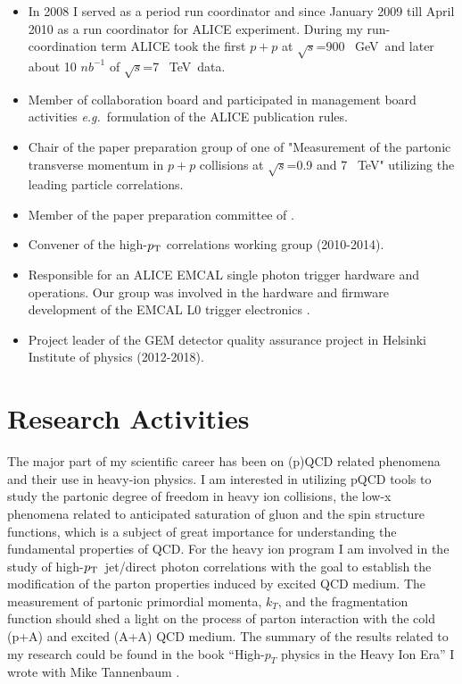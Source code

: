 \documentclass[12pt]{article}
\newcommand{\s} {\ensuremath{\sqrt{s}}}
\def\tev{\mbox{~TeV}}
\def\gev{\mbox{~GeV}}
\def\eg{{\it e.g.}}
\def\pt#1{\ensuremath{p_{\rm T#1}}}
\begin{document}
\begin{itemize}
\item In 2008 I served as a period run coordinator and since January 2009 till April 2010  as a run coordinator for ALICE experiment. During my run-coordination term ALICE took the first $p+p$ at \s=900 \gev\ and later about 10 $nb^{-1}$ of \s=7 \tev\ data.
\item Member of collaboration board and participated in management board activities \eg\ formulation of the ALICE publication rules.
\item Chair of the paper preparation group of one of  "Measurement of the partonic transverse momentum in $p+p$ collisions at \s=0.9 and 7 \tev" utilizing the leading particle correlations. 
\item Member of the paper preparation committee of \cite{Aamodt2012}.
\item Convener of the high-\pt{} correlations working group (2010-2014).
\item Responsible for an ALICE EMCAL single photon trigger hardware and operations. Our group was involved in the hardware and firmware development of the EMCAL L0 trigger electronics \cite{JiriKral2012}.
\item Project leader of the GEM detector quality assurance project in Helsinki Institute of physics (2012-2018).
\end{itemize}



\section{Research Activities}
The major part of my scientific career has been on (p)QCD related phenomena and their use in heavy-ion physics.  I am interested in utilizing pQCD tools to study the partonic degree of freedom in heavy ion collisions, the low-x phenomena related to anticipated saturation of gluon and the spin structure functions, which is a subject of great importance for understanding the fundamental properties of QCD.  For the heavy ion program I am involved in the study of high-\pt{}\ jet/direct photon correlations with the goal to establish the modification of the parton properties induced by excited QCD medium.  The measurement of partonic primordial momenta, $k_T$, and the fragmentation function should shed a light on the process of parton interaction with the cold (p+A) and excited (A+A) QCD medium. 
The summary of the results related to my research could be found in the book ``High-$p_{T}$ physics in the Heavy Ion Era'' I wrote with Mike Tannenbaum  \cite{JanRak2013}.




\end{document}
